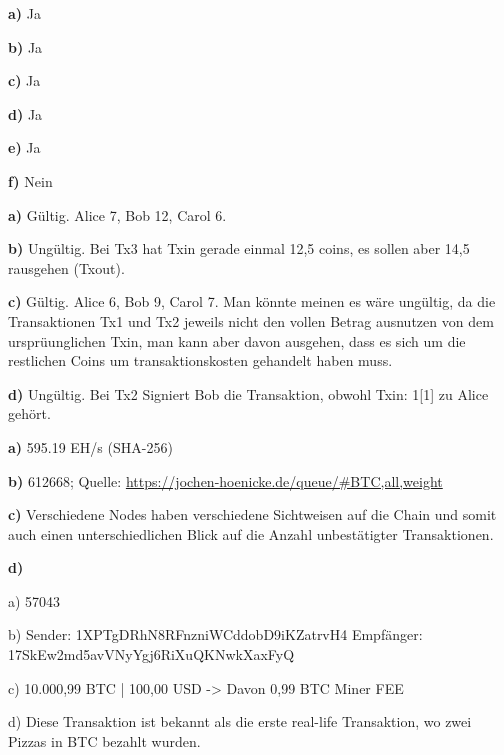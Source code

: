 \documentclass[german]{../uebung}
\begin{document}
\begin{exercise}{3}

    \textbf{a)}
    Ja

    \textbf{b)}
    Ja

    \textbf{c)}
    Ja

    \textbf{d)}
    Ja

    \textbf{e)}
    Ja

    \textbf{f)}
    Nein
\end{exercise}

\begin{exercise}{4}

    \textbf{a)}
    Gültig. Alice 7, Bob 12, Carol 6.

    \textbf{b)}
    Ungültig. Bei Tx3 hat Txin gerade einmal 12,5 coins, es sollen aber 14,5 rausgehen (Txout).

    \textbf{c)}
    Gültig. Alice 6, Bob 9, Carol 7. Man könnte meinen es wäre ungültig, da die Transaktionen Tx1 und Tx2 jeweils nicht den vollen Betrag ausnutzen von dem ursprüunglichen Txin, man kann aber davon ausgehen, dass es sich um die restlichen Coins um transaktionskosten gehandelt haben muss.

    \textbf{d)}
    Ungültig. Bei Tx2 Signiert Bob die Transaktion, obwohl Txin: 1[1] zu Alice gehört.
\end{exercise}

\begin{exercise}{5}

    \textbf{a)}
    595.19 EH/s (SHA-256)

    \textbf{b)}
    612668; Quelle: \url{https://jochen-hoenicke.de/queue/#BTC,all,weight}

    \textbf{c)}
    Verschiedene Nodes haben verschiedene Sichtweisen auf die Chain und somit auch einen unterschiedlichen Blick auf die Anzahl unbestätigter Transaktionen.

    \textbf{d)}

    a) 57043

    b) Sender: 1XPTgDRhN8RFnzniWCddobD9iKZatrvH4 Empfänger: 17SkEw2md5avVNyYgj6RiXuQKNwkXaxFyQ

    c) 10.000,99 BTC | 100,00 USD -> Davon 0,99 BTC Miner FEE

    d) Diese Transaktion ist bekannt als die erste real-life Transaktion, wo zwei Pizzas in BTC bezahlt wurden.
\end{exercise}
\end{document}
